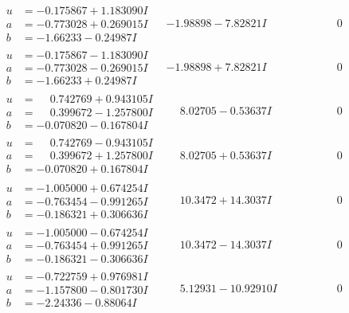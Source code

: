 \documentclass[1p]{elsarticle_modified}
\theoremstyle{definition}
\begin{document}
$$\begin{array}{c|c|c}
\begin{aligned}
u &= -0.175867 + 1.183090 I \\
a &= -0.773028 + 0.269015 I \\
b &= -1.66233 - 0.24987 I\end{aligned}
 & -1.98898 - 7.82821 I & \phantom{-0.000000 } 0 \\ \hline\begin{aligned}
u &= -0.175867 - 1.183090 I \\
a &= -0.773028 - 0.269015 I \\
b &= -1.66233 + 0.24987 I\end{aligned}
 & -1.98898 + 7.82821 I & \phantom{-0.000000 } 0 \\ \hline\begin{aligned}
u &= \phantom{-}0.742769 + 0.943105 I \\
a &= \phantom{-}0.399672 - 1.257800 I \\
b &= -0.070820 - 0.167804 I\end{aligned}
 & \phantom{-}8.02705 - 0.53637 I & \phantom{-0.000000 } 0 \\ \hline\begin{aligned}
u &= \phantom{-}0.742769 - 0.943105 I \\
a &= \phantom{-}0.399672 + 1.257800 I \\
b &= -0.070820 + 0.167804 I\end{aligned}
 & \phantom{-}8.02705 + 0.53637 I & \phantom{-0.000000 } 0 \\ \hline\begin{aligned}
u &= -1.005000 + 0.674254 I \\
a &= -0.763454 - 0.991265 I \\
b &= -0.186321 + 0.306636 I\end{aligned}
 & \phantom{-}10.3472 + 14.3037 I & \phantom{-0.000000 } 0 \\ \hline\begin{aligned}
u &= -1.005000 - 0.674254 I \\
a &= -0.763454 + 0.991265 I \\
b &= -0.186321 - 0.306636 I\end{aligned}
 & \phantom{-}10.3472 - 14.3037 I & \phantom{-0.000000 } 0 \\ \hline\begin{aligned}
u &= -0.722759 + 0.976981 I \\
a &= -1.157800 - 0.801730 I \\
b &= -2.24336 - 0.88064 I\end{aligned}
 & \phantom{-}5.12931 - 10.92910 I & \phantom{-0.000000 } 0 \\ \hline\begin{aligned}

\end{aligned}
\end{array}$$
\end{document}
